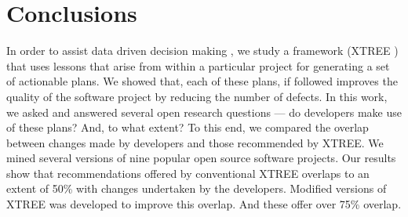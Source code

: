 \documentclass[sigconf, proceedings, 9pt]{acmart}
\begin{document}
\section{Conclusions}
\label{sect:conclusion}
In order to assist data driven decision making , we study a framework (XTREE ) 
that uses lessons that arise from within a particular project 
for generating a set of actionable plans. We 
showed that, each of these plans, if followed improves the quality of 
the software project by reducing the number of defects. In this work, 
we asked and answered several open research questions --- do developers make 
use of these plans? And, to what extent? To this end, we compared the 
overlap between changes made by developers and those recommended by XTREE. We 
mined several versions of nine popular open source software 
projects. Our results show that recommendations offered by conventional XTREE 
overlaps to an extent of 50\% with changes undertaken by the developers. 
Modified versions of XTREE was developed to improve this overlap. And these 
offer over 75\% overlap.



\balance


\end{document}
